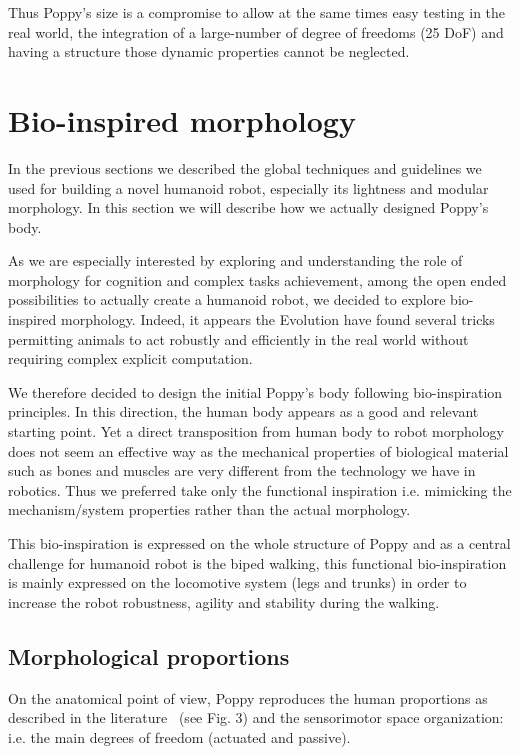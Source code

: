 Thus Poppy's size is a compromise to allow at the same times easy testing in the real world, the integration of a large-number of degree of freedoms (25 DoF) and having a structure those dynamic properties cannot be neglected.

\section{Bio-inspired morphology} %

In the previous sections we described the global techniques and guidelines we used for building a novel humanoid robot, especially its lightness and modular morphology. In this section we will describe how we actually designed Poppy's body.

As we are especially interested by exploring and understanding the role of morphology for cognition and complex tasks achievement, among the open ended possibilities to actually create a humanoid robot, we decided to explore bio-inspired morphology. Indeed, it appears the Evolution have found several tricks permitting animals to act robustly and efficiently in the real world without requiring complex explicit computation.

We therefore decided to design the initial Poppy's body following bio-inspiration principles. In this direction, the human body appears as a good and relevant starting point. Yet a direct transposition from human body to robot morphology does not seem an effective way as the mechanical properties of biological material such as bones and muscles are very different from the technology we have in robotics. Thus we preferred take only the functional inspiration i.e. mimicking the mechanism/system properties rather than the actual morphology.

This bio-inspiration is expressed on the whole structure of Poppy and as a central challenge for humanoid robot is the biped walking, this functional bio-inspiration is mainly expressed on the locomotive system (legs and trunks) in order to increase the robot robustness, agility and stability during the walking.


\subsection{Morphological proportions} %

On the anatomical point of view, Poppy reproduces the human proportions as described in the literature~\parencite{dufour2005biomecanique} (see Fig. 3) and the sensorimotor space organization: i.e. the main degrees of freedom (actuated and passive).

